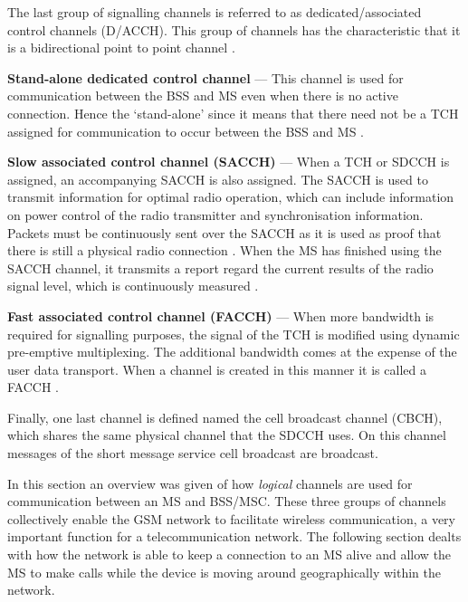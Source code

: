 The last group of signalling channels is referred to as dedicated/associated control channels (D/ACCH). This group of channels has the characteristic that it is a bidirectional point to point channel \cite{GSMArchitectureProtocolsServices}.
\begin{description}
\item{\textbf{Stand-alone dedicated control channel}} --- This channel is used for communication between the BSS and MS even when there is no active connection. Hence the `stand-alone' since it means that there need not be a TCH assigned for communication to occur between the BSS and MS \cite{GSMArchitectureProtocolsServices}.
\item{\textbf{Slow associated control channel (SACCH)}} --- When a TCH or SDCCH is assigned, an accompanying SACCH is also assigned. The SACCH is used to transmit information for optimal radio operation, which can include information on power control of the radio transmitter and synchronisation information. Packets must be continuously sent over the SACCH as it is used as proof that there is still a physical radio connection \cite{GSMArchitectureProtocolsServices}. When the MS has finished using the SACCH channel, it transmits a report regard the current results of the radio signal level, which is continuously measured \cite{GSMArchitectureProtocolsServices}.
\item{\textbf{Fast associated control channel (FACCH)}} --- When more bandwidth is required for signalling purposes, the signal of the TCH is modified using dynamic pre-emptive multiplexing. The additional bandwidth comes at the expense of the user data transport. When a channel is created in this manner it is called a FACCH \cite{GSMArchitectureProtocolsServices}.
\end{description}

Finally, one last channel is defined named the cell broadcast channel (CBCH), which shares the same physical channel that the SDCCH uses. On this channel messages of the short message service cell broadcast are broadcast\cite{GSMArchitectureProtocolsServices}.

In this section an overview was given of how \emph{logical} channels are used for communication between an MS and BSS/MSC\@. These three groups of channels collectively enable the GSM network to facilitate wireless communication, a very important function for a telecommunication network. The following section dealts with how the network is able to keep a connection to an MS alive and allow the MS to make calls while the device is moving around geographically within the network.
